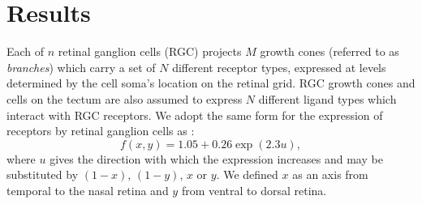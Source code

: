 \documentclass[9pt,lineno,draft]{elife}
\begin{document}

\section{Results}


Each of $n$ retinal ganglion cells (RGC) projects $M$ growth cones (referred to as \emph{branches}) which carry a set of $N$ different receptor types, expressed at levels determined by the cell soma's location on the retinal grid. RGC growth cones and cells on the tectum are also assumed to express $N$ different ligand types which interact with RGC receptors.
%
We adopt the same form for the expression of receptors by retinal ganglion cells as
\citet{simpson_simple_2011}:
\begin{equation} \label{e:f}
  f(x,y) = 1.05 + 0.26 \exp(2.3 u),
\end{equation}
where $u$ gives the direction with which the expression increases and may be substituted by $(1-x)$, $(1-y)$, $x$ or $y$. We defined $x$ as an axis from temporal to the nasal retina and $y$ from ventral to dorsal retina.
\end{document}
